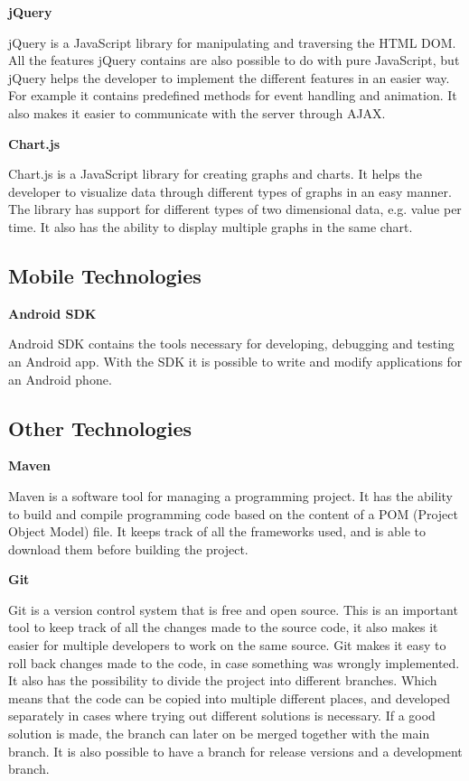 \textbf{jQuery} \cite{jQuery}

jQuery is a JavaScript library for manipulating and traversing the HTML DOM.
All the features jQuery contains are also possible to do with pure JavaScript, but jQuery helps the developer to implement the different features in an easier way.
For example it contains predefined methods for event handling and animation.
It also makes it easier to communicate with the server through AJAX.

\textbf{Chart.js} \cite{Chartjs}

Chart.js is a JavaScript library for creating graphs and charts.
It helps the developer to visualize data through different types of graphs in an easy manner.
The library has support for different types of two dimensional data, e.g. value per time.
It also has the ability to display multiple graphs in the same chart.

\subsection{Mobile Technologies}

\textbf{Android SDK} \cite{AndroidSDK}

Android SDK contains the tools necessary for developing, debugging and testing an Android app.
With the SDK it is possible to write and modify applications for an Android phone.

\subsection{Other Technologies}

\textbf{Maven} \cite{Maven}

Maven is a software tool for managing a programming project.
It has the ability to build and compile programming code based on the content of a POM (Project Object Model) file.
It keeps track of all the frameworks used, and is able to download them before building the project.

\textbf{Git} \cite{Git}

Git is a version control system that is free and open source.
This is an important tool to keep track of all the changes made to the source code, it also makes it easier for multiple developers to work on the same source.
Git makes it easy to roll back changes made to the code, in case something was wrongly implemented.
It also has the possibility to divide the project into different branches.
Which means that the code can be copied into multiple different places, and developed separately in cases where trying out different solutions is necessary.
If a good solution is made, the branch can later on be merged together with the main branch.
It is also possible to have a branch for release versions and a development branch.

